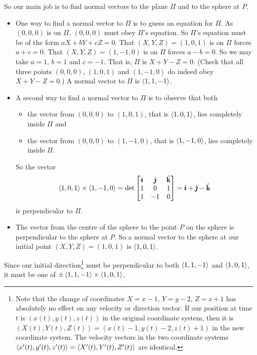 \begin{solution}
So our main job is to find normal vectors to the plane $\Pi$ and to the
sphere at $P$. 
\begin{itemize} 
\item One way to find a normal vector to $\Pi$ is to guess an equation for
$\Pi$. As $(0,0,0)$ is on $\Pi$, $(0,0,0)$ must obey $\Pi$'s equation.
So $\Pi$'s equation must be of the form $aX+bY+cZ=0$. That $(X,Y,Z)=(1,0,1)$ 
is on $\Pi$ forces $a+c=0$.   That $(X,Y,Z)=(1,-1,0)$ is on $\Pi$ forces 
$a-b=0$. So we may take $a=1$, $b=1$ and $c=-1$. That is, $\Pi$ is   
$X+Y-Z=0$.  (Check that all three points $(0,0,0)$, $(1,0,1)$ and
$(1,-1,0)$ do indeed obey $X+Y-Z=0$.) A normal vector to $\Pi$ is
$\left< 1,1,-1\right>$.
\item A second way to find a normal vector to $\Pi$ is to observe that
both
\begin{itemize}
\item
the vector from $(0,0,0)$ to $(1,0,1)$, that is $\left< 1,0,1\right>$, 
lies completely inside $\Pi$ and
\item
the vector from $(0,0,0)$ to $(1,-1,0)$, that is $\left< 1,-1,0\right>$, 
lies completely inside $\Pi$.
\end{itemize}
So the vector
\begin{equation*}
\left< 1,0,1\right>\times\left< 1,-1,0\right>
=\det\left[\begin{matrix}
                     \hat{\pmb{\imath}} & \hat{\pmb{\jmath}} & \hat{\mathbf{k}} \\
                     1   &  0  & 1 \\
                     1   &  -1  & 0
                \end{matrix}\right]
=\hat{\pmb{\imath}} + \hat{\pmb{\jmath}} -\hat{\mathbf{k}}
\end{equation*}
is perpendicular to $\Pi$.
\item
The vector from the centre of the sphere to the point $P$ on the sphere
is perpendicular to the sphere at $P$. So a normal vector to 
the sphere at our initial point $(X,Y,Z)=(1,0,1)$ is $\left< 1,0,1\right>$.
\end{itemize}
Since our initial direction\footnote{Note that the change of coordinates
$X=x-1$, $Y=y-2$, $Z=z+1$ has absolutely no effect on any velocity or direction
vector. If our position at time $t$ is $(x(t),y(t),z(t))$ in the
original coordinate system, then it is $(X(t),Y(t),Z(t))
=(x(t)-1,y(t)-2,z(t)+1)$ in the new coordinate system. The velocity
vectors in the two coordinate systems $\left< x'(t),y'(t),z'(t)\right>
=\left< X'(t),Y'(t),Z'(t)\right>$ are identical.}
must be perpendicular to both $\left< 1,1,-1\right>$ and $\left< 1,0,1\right>$, 
it must be one of  $\pm\left< 1,1,-1\right>\times\left< 1,0,1\right>$. 

\end{solution}
